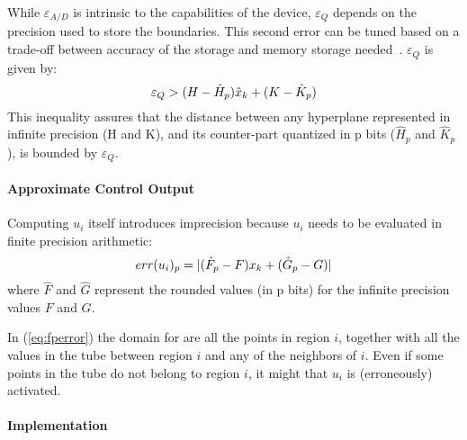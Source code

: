 While $\varepsilon_{A/D}$ is intrinsic to the capabilities of the device,
$\varepsilon_{Q}$ depends on the precision used to store the boundaries. This
second error can be tuned based on a trade-off between accuracy of the storage and
memory storage needed~\cite{memoryMPC}.
%
$\varepsilon_{Q}$ is given by:
\begin{equation}\label{eq:quantizationlines}
  \varepsilon_{Q} > (H-\hat{H}_{p})\hat{x}_{k}+(K-\hat{K}_{p})
\end{equation}
This inequality assures that the distance between any hyperplane represented in infinite precision (H and K), and its counter-part quantized in p bits ($\hat{H}_{p}$ and $\hat{K}_{p}$), is bounded by $\varepsilon_{Q}$. 


\paragraph{Approximate Control Output}

Computing $u_{i}$ itself introduces imprecision because $u_i$ needs to be evaluated 
in finite precision arithmetic:
\begin{equation}\label{eq:fperror}
  err(u_{i})_{p}=|(\hat{F}_{p}-F)x_{k}+(\hat{G}_{p}-G)|
\end{equation}
where $\hat{F}$ and $\hat{G}$ represent the rounded values (in p bits) for the infinite precision values $F$ and $G$.

In (\ref{eq:fperror}) the domain for \statevarmath are all the points in region
$i$, together with all the values in the tube between region $i$ and
any of the neighbors of $i$. Even if some points in the tube do not belong to
region $i$, it might that $u_{i}$ is (erroneously) activated. 


\paragraph{Implementation}